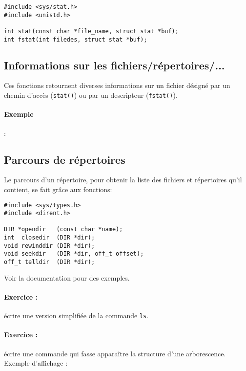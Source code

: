 \extrait
\begin{lstlisting}
#include <sys/stat.h>
#include <unistd.h>

int stat(const char *file_name, struct stat *buf);
int fstat(int filedes, struct stat *buf);
\end{lstlisting}

\subsection{Informations sur les fichiers/répertoires/...}


Ces fonctions retournent diverses informations sur un
fichier désigné par un chemin d'accès (\texttt{stat()}) ou par un 
descripteur (\texttt{fstat()}). 

\paragraph*{Exemple} :

\source



\subsection{Parcours de répertoires}

Le parcours d'un répertoire, pour obtenir la liste des fichiers et
répertoires qu'il contient, se fait grâce aux fonctions:


\extrait
\begin{lstlisting}
#include <sys/types.h>
#include <dirent.h>
  
DIR *opendir   (const char *name);
int  closedir  (DIR *dir);
void rewinddir (DIR *dir);
void seekdir   (DIR *dir, off_t offset);
off_t telldir  (DIR *dir);
\end{lstlisting}


Voir la documentation pour des exemples. 

\paragraph*{Exercice : } écrire une version  simplifiée de la
commande \texttt{ls}.

\paragraph*{Exercice : } écrire une commande qui fasse apparaître la 
structure d'une arborescence. Exemple d'affichage :

